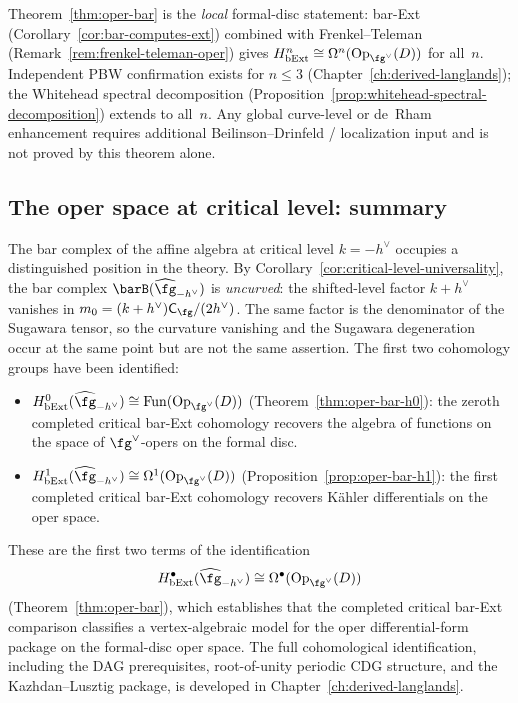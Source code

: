 \begin{remark}[Scope]\label{rem:oper-bar-scope}
Theorem~\ref{thm:oper-bar} is the \emph{local} formal-disc statement:
bar-Ext (Corollary~\ref{cor:bar-computes-ext}) combined with
Frenkel--Teleman (Remark~\ref{rem:frenkel-teleman-oper}) gives
$H^n_{\mathrm{bExt}} \cong \Omega^n(\mathrm{Op}_{\fg^\vee}(D))$ for all~$n$.
Independent PBW confirmation exists for $n \leq 3$
(Chapter~\ref{ch:derived-langlands}); the Whitehead spectral
decomposition (Proposition~\ref{prop:whitehead-spectral-decomposition})
extends to all~$n$. Any global curve-level or de~Rham enhancement
requires additional Beilinson--Drinfeld / localization input and is not
proved by this theorem alone.
\end{remark}

\subsection{The oper space at critical level: summary}
\label{subsec:oper-critical-summary}

The bar complex of the affine algebra at critical level
$k = -h^\vee$ occupies a distinguished position in the theory.
By Corollary~\ref{cor:critical-level-universality}, the bar
complex $\barB(\widehat{\fg}_{-h^\vee})$ is \emph{uncurved}:
the shifted-level factor $k+h^\vee$ vanishes in
$m_0=(k+h^\vee)\mathsf C_{\fg}/(2h^\vee)$.  The same factor is the
denominator of the Sugawara tensor, so the curvature vanishing and
the Sugawara degeneration occur at the same point but are not the
same assertion. The first two cohomology groups have been identified:

\begin{itemize}
\item $H^0_{\mathrm{bExt}}(\widehat{\fg}_{-h^\vee})
 \cong \mathrm{Fun}(\mathrm{Op}_{\fg^\vee}(D))$
 (Theorem~\ref{thm:oper-bar-h0}): the zeroth completed critical
 bar-Ext cohomology recovers the algebra of functions on the space of
 $\fg^\vee$-opers on the formal disc.
\item $H^1_{\mathrm{bExt}}(\widehat{\fg}_{-h^\vee})
 \cong \Omega^1(\mathrm{Op}_{\fg^\vee}(D))$
 (Proposition~\ref{prop:oper-bar-h1}): the first completed critical
 bar-Ext cohomology recovers K\"ahler differentials on the oper
 space.
\end{itemize}

These are the first two terms of the identification
\[
H^\bullet_{\mathrm{bExt}}(\widehat{\fg}_{-h^\vee})
\cong \Omega^\bullet(\mathrm{Op}_{\fg^\vee}(D))
\]
(Theorem~\ref{thm:oper-bar}), which establishes that the completed
critical bar-Ext comparison classifies a vertex-algebraic model for
the oper differential-form package on the formal-disc oper space. The full
cohomological identification,
including the DAG prerequisites, root-of-unity periodic CDG
structure, and the Kazhdan--Lusztig package, is developed in
Chapter~\ref{ch:derived-langlands}.

